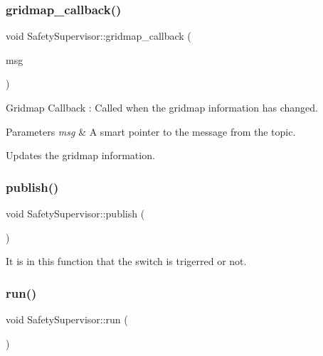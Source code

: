 \subsubsection{\texorpdfstring{gridmap\+\_\+callback()}{gridmap\_callback()}}
{\footnotesize\ttfamily void Safety\+Supervisor\+::gridmap\+\_\+callback (\begin{DoxyParamCaption}\item[{const grid\+\_\+map\+\_\+msgs\+::\+Grid\+Map\+::\+Const\+Ptr \&}]{msg }\end{DoxyParamCaption})\hspace{0.3cm}{\ttfamily [inline]}}



Gridmap Callback \+: Called when the gridmap information has changed. 


\begin{DoxyParams}{Parameters}
{\em msg} & A smart pointer to the message from the topic.\\
\hline
\end{DoxyParams}
Updates the gridmap information. \mbox{\label{classSafetySupervisor_ad4352fec1b8dcbb3b7b89d4caf805542}} 
\subsubsection{\texorpdfstring{publish()}{publish()}}
{\footnotesize\ttfamily void Safety\+Supervisor\+::publish (\begin{DoxyParamCaption}{ }\end{DoxyParamCaption})\hspace{0.3cm}{\ttfamily [inline]}}



It is in this function that the switch is trigerred or not. 

\mbox{\label{classSafetySupervisor_ab4bca128bf76578d1249d6f0c8887466}} 
\subsubsection{\texorpdfstring{run()}{run()}}
{\footnotesize\ttfamily void Safety\+Supervisor\+::run (\begin{DoxyParamCaption}{ }\end{DoxyParamCaption})\hspace{0.3cm}{\ttfamily [inline]}}



